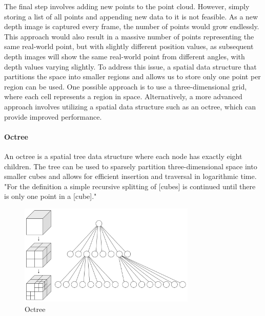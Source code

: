 The final step involves adding new points to the point cloud.
However, simply storing a list of all points and appending new data to it is not feasible.
As a new depth image is captured every frame, the number of points would grow endlessly.
This approach would also result in a massive number of points representing the same real-world point,
but with slightly different position values,
as subsequent depth images will show the same real-world point from different angles, with depth values varying slightly.
To address this issue, a spatial data structure that partitions the space into smaller regions and
allows us to store only one point per region can be used.
One possible approach is to use a three-dimensional grid, where each cell represents a region in space.
Alternatively, a more advanced approach involves utilizing a spatial data structure such as an octree,
which can provide improved performance.

\paragraph{Octree}
An octree is a spatial tree data structure where each node has exactly eight children.
The tree can be used to sparsely partition three-dimensional space into smaller cubes and allows for efficient
insertion and traversal in logarithmic time.
"For the definition a simple recursive splitting of [cubes] is continued until there is only one point in a [cube]."
\parencite{gabriel_zachmann_geometric_2002}

\begin{figure}[h]
    \centering
    \includegraphics[width=0.75\textwidth]{images/octree}
    \caption{Octree}
    \label{fig:octrree}
\end{figure}

